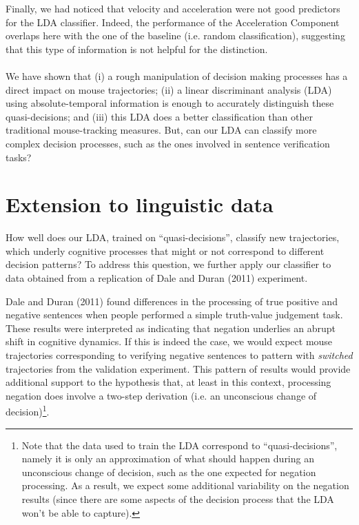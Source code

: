 \documentclass{article}
\newcommand{\addMM}[1]{{\leavevmode\color{red}#1}}
\begin{document}
\addMM{Finally, we had noticed that velocity and acceleration were not good predictors for the LDA classifier. Indeed, the performance of the Acceleration Component overlaps here with the one of the baseline (i.e. random classification), suggesting that this type of information is not helpful for the distinction.}

\paragraph{}
We have shown that (i) a rough manipulation of decision making processes has a direct impact on mouse trajectories; (ii) a linear discriminant analysis (LDA) using absolute-temporal information is enough to accurately distinguish these quasi-decisions; and (iii) this LDA does a better classification than other traditional mouse-tracking measures. But, can our LDA can classify more complex decision processes, such as the ones involved in sentence verification tasks? 


\section{Extension to linguistic data}
How well does our LDA, trained on “quasi-decisions”, classify new trajectories, which underly cognitive processes that might or not correspond to different decision patterns? To address this question, we further apply our classifier to data obtained from a replication of Dale and Duran (2011) experiment.   
 
Dale and Duran (2011) found differences in the processing of true positive and negative sentences when people performed a simple truth-value judgement task. These results were interpreted as indicating that negation underlies an abrupt shift in cognitive dynamics. If 
this is indeed the case, we would expect mouse trajectories corresponding to verifying negative sentences to pattern with \emph{switched} trajectories from the validation experiment. This pattern of results would provide additional support to the hypothesis that, at least in this context, processing negation does involve a two-step derivation (i.e. an unconscious change of decision)\footnote{Note that the data used to train the LDA correspond to ``quasi-decisions'', namely it is only an approximation of what should happen during an unconscious change of decision, such as the one expected for negation processing. As a result, we expect some additional variability on the negation results (since there are some aspects of the decision process that the LDA won't be able to capture).}. 
\end{document}
